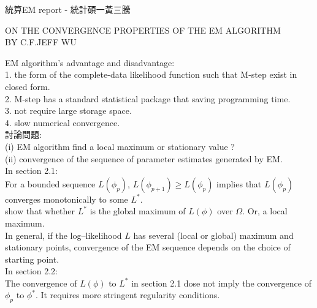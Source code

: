 \documentclass{article}
\begin{document}
	\begin{center}
	  \LARGE{統算EM report - }
	  統計碩一黃三騰
	\end{center}
	
	\begin{center}
	ON THE CONVERGENCE PROPERTIES OF THE EM ALGORITHM\\
	BY C.F.JEFF WU
	\end{center}
	EM algorithm's advantage and disadvantage:\\
    1. the form of the complete-data likelihood function such that M-step exist in closed form.\\
    2. M-step has a standard statistical package that saving programming time.\\
    3. not require large storage space.\\
    4. slow numerical convergence.\\[0.5cm]
    
    
    討論問題:\\
	(i) EM algorithm find a local maximum or stationary value ?\\
    (ii) convergence of the sequence of parameter estimates generated by EM.\\[0.3cm]
    
    In section 2.1: \\
    For a bounded sequence $L(\phi_p)$, $L(\phi_{p+1})\geq L(\phi_p) $ implies that $L(\phi_p)$ converges monotonically to some $L^*$.\\
    show that whether $L^*$ is the global maximum of $L(\phi)$ over $\Omega$. Or, a local maximum.\\
    In general, if the log--likelihood $L$ has several (local or global) maximum and stationary points, convergence of the EM sequence depends on the choice of starting point.\\[0.3cm]
    
    In section 2.2: \\
    The convergence of $L(\phi)$ to $L^*$ in section 2.1 dose not imply the convergence of $\phi_p$ to $\phi^*$. It requires more stringent regularity conditions.\\
     
            
       
    
\end{document}
